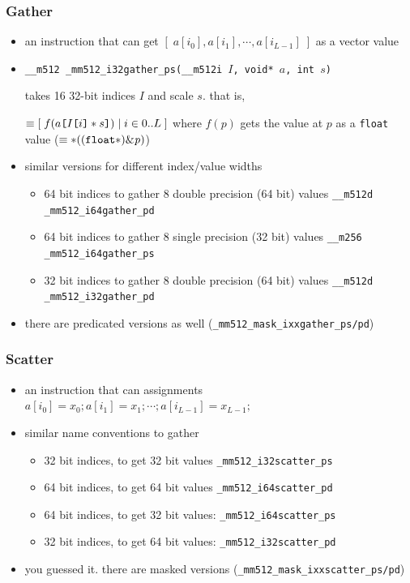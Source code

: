 \documentclass[12pt,dvipdfmx]{beamer}
\begin{document}
\begin{frame}[fragile]
  \frametitle{Gather}
  \begin{itemize}
  \item an instruction that can get
    $[\;a[i_0], a[i_1], \cdots, a[i_{L-1}]\;]$ as a vector value
    
  \item 
    {\tt \_\_m512 \_mm512\_i32gather\_ps(\_\_m512i $I$, void* $a$, int $s$)}

    takes 16 32-bit indices $I$ and scale $s$. that is,
    
    $\equiv [\;f(a\mbox{\tt [}I\mbox{\tt [}i\mbox{\tt ]} * s\mbox{\tt ]}) \;|\; i \in 0..L \;] $
    where $f(p)$ gets the value at $p$ as a {\tt float} value
    ($\equiv {\tt *((float*)\&{\it p})}$)

  \item similar versions for different index/value widths
    \begin{itemize}
    \item 64 bit indices to gather 8 double precision (64 bit) values
      {\tt \_\_m512d \_mm512\_i64gather\_pd}
    \item 64 bit indices to gather 8 single precision (32 bit) values
      {\tt \_\_m256 \_mm512\_i64gather\_ps}
    \item 32 bit indices to gather 8 double precision (64 bit) values
      {\tt \_\_m512d \_mm512\_i32gather\_pd}
    \end{itemize}
    
  \item there are predicated versions as well
    ({\tt \_mm512\_mask\_i{\tt xx}gather\_ps/pd})
  \end{itemize}
\end{frame}

\begin{frame}
  \frametitle{Scatter}
  \begin{itemize}
  \item an instruction that can assignments
    $a[i_0] = x_0; a[i_1] = x_1; \cdots ; a[i_{L-1}] = x_{L-1};$ 
    
  \item similar name conventions to gather
    \begin{itemize}
    \item 32 bit indices, to get 32 bit values
      {\tt \_mm512\_i32scatter\_ps}
    \item 64 bit indices, to get 64 bit values
      {\tt \_mm512\_i64scatter\_pd}
    \item 64 bit indices, to get 32 bit values:
      {\tt \_mm512\_i64scatter\_ps}
    \item 32 bit indices, to get 64 bit values:
      {\tt \_mm512\_i32scatter\_pd}
    \end{itemize}
  \item you guessed it. there are masked versions
    ({\tt \_mm512\_mask\_i{\tt xx}scatter\_ps/pd})
  \end{itemize}
\end{frame}
\end{document}
